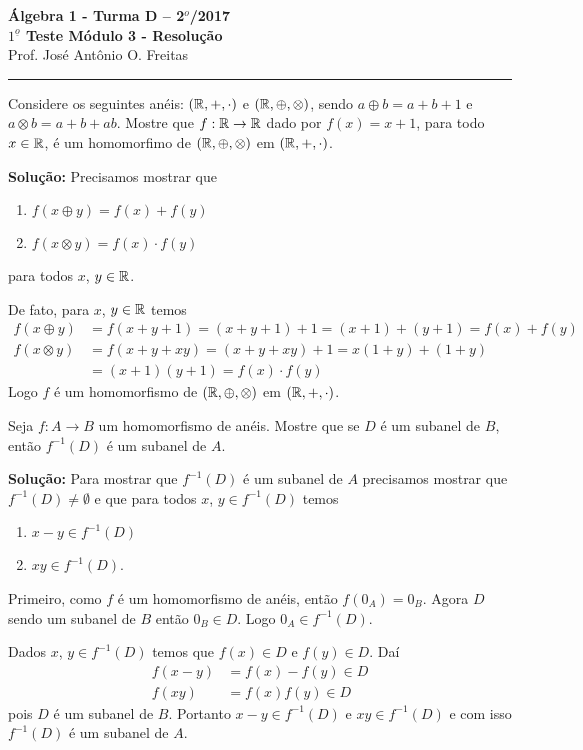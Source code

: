 \documentclass[12pt]{article}
\begin{document}


\begin{center}
{\Large\bf {\'A}lgebra 1 - Turma D -- 2$^{o}$/2017} \\ \vspace{9pt} {\large\bf
  $1^{\underline{o}}$ Teste Módulo 3 - Resolu\c{c}\~ao}\\
\vspace{9pt} Prof. Jos{\'e} Ant{\^o}nio O. Freitas
\end{center}
\hrule

\vspace{.6cm}

\questao Considere os seguintes an{\'e}is: $(\mathbb{R}, +, \cdot)$ e $(\mathbb{R}, \oplus, \otimes)$, sendo $a \oplus b = a + b + 1$ e $a \otimes b = a + b + ab$. Mostre que $f : \mathbb{R} \to \mathbb{R}$ dado por $f(x) = x + 1$, para todo $x \in \mathbb{R}$, {\'e} um homomorfimo de $(\mathbb{R}, \oplus, \otimes)$ em $(\mathbb{R}, +, \cdot)$.

\noindent\textbf{Solu\c{c}\~ao:}
Precisamos mostrar que
\begin{enumerate}
	\item $f(x \oplus y) = f(x) + f(y)$
	\item $f(x \otimes y) = f(x)\cdot f(y)$
\end{enumerate}
para todos $x$, $y \in \mathbb{R}$.

De fato, para $x$, $y \in \mathbb{R}$ temos
\begin{align*}
	f(x \oplus y) &= f(x + y + 1) = (x + y + 1) + 1 = (x + 1) + (y + 1) = f(x) + f(y)\\
	f(x \otimes y) &=  f(x + y + xy) = (x + y + xy) + 1 = x(1 + y) + (1 + y) \\ &= (x + 1)(y + 1) = f(x)\cdot f(y)
\end{align*}
Logo $f$ é um homomorfismo de $(\mathbb{R}, \oplus, \otimes)$ em $(\mathbb{R}, +, \cdot)$.

\vspace{.5cm}

\questao Seja $f: A \to B$ um homomorfismo de an{\'e}is. Mostre que se $D$ {\'e} um subanel de $B$, ent{\~a}o $f^{-1}(D)$ {\'e} um subanel de $A$.

\noindent\textbf{Solu\c{c}\~ao:} Para mostrar que $f^{-1}(D)$ é um subanel de $A$ precisamos mostrar que $f^{-1}(D) \ne \emptyset$ e que para todos $x$, $y \in f^{-1}(D)$ temos
\begin{enumerate}
	\item $x - y \in f^{-1}(D)$
	\item $xy \in f^{-1}(D)$.
\end{enumerate}

Primeiro, como $f$ é um homomorfismo de anéis, então $f(0_A) = 0_B$. Agora $D$ sendo um subanel de $B$ então $0_B \in D$. Logo $0_A \in f^{-1}(D)$.

Dados $x$, $y \in f^{-1}(D)$ temos que $f(x) \in D$ e $f(y) \in D$. Daí
\begin{align*}
	f(x - y) &= f(x) - f(y) \in D\\
	f(xy) &= f(x)f(y) \in D
\end{align*}
pois $D$ é um subanel de $B$. Portanto $x - y \in f^{-1}(D)$ e $xy \in f^{-1}(D)$ e com isso $f^{-1}(D)$ é um subanel de $A$.
\end{document}
